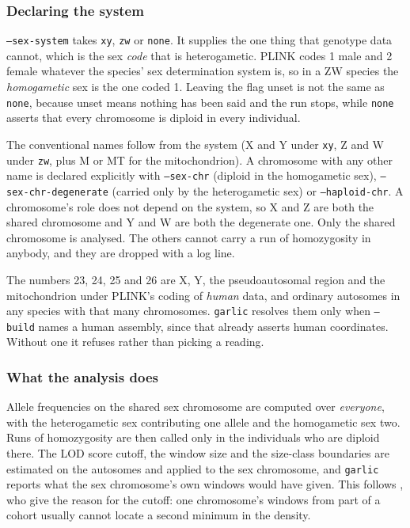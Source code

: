 \documentclass[12pt]{article}%
\begin{document}
\subsubsection{Declaring the system}

{\tt --sex-system} takes {\tt xy}, {\tt zw} or {\tt none}.  It supplies the one
thing that genotype data cannot, which is the sex \emph{code} that is
heterogametic.  PLINK codes 1 male and 2 female whatever the species' sex
determination system is, so in a ZW species the \emph{homogametic} sex is the
one coded 1.  Leaving the flag unset is not the same as {\tt none}, because
unset means nothing has been said and the run stops, while {\tt none} asserts
that every chromosome is diploid in every individual.

The conventional names follow from the system (X and Y under {\tt xy}, Z and
W under {\tt zw}, plus M or MT for the mitochondrion).  A chromosome with any
other name is declared explicitly with {\tt --sex-chr} (diploid in the
homogametic sex), {\tt --sex-chr-degenerate} (carried only by the heterogametic
sex) or {\tt --haploid-chr}.  A chromosome's role does not depend on the
system, so X and Z are both the shared chromosome and Y and W are both the
degenerate one.  Only the shared chromosome is analysed.  The others cannot
carry a run of homozygosity in anybody, and they are dropped with a log line.

The numbers 23, 24, 25 and 26 are X, Y, the pseudoautosomal region and the
mitochondrion under PLINK's coding of \emph{human} data, and ordinary autosomes
in any species with that many chromosomes.  {\tt garlic} resolves them only
when {\tt --build} names a human assembly, since that already asserts human
coordinates.  Without one it refuses rather than picking a reading.

\subsubsection{What the analysis does}

Allele frequencies on the shared sex chromosome are computed over
\emph{everyone}, with the heterogametic sex contributing one allele and the
homogametic sex two.  Runs of homozygosity are then called only in the
individuals who are diploid there.  The LOD score cutoff, the window size and
the size-class boundaries are estimated on the autosomes and applied to the sex
chromosome, and {\tt garlic} reports what the sex chromosome's own windows
would have given.  This follows \citet{CotterEtAl24}, who give the reason for
the cutoff: one chromosome's windows from part of a cohort usually cannot
locate a second minimum in the density.
\end{document}
